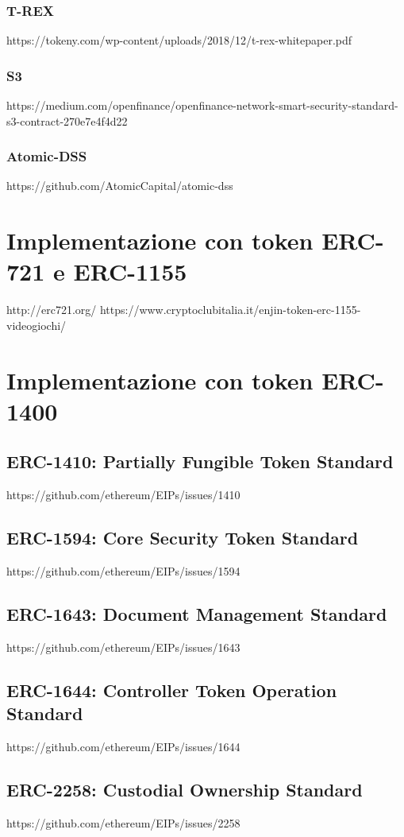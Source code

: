 \subsubsection{T-REX}
https://tokeny.com/wp-content/uploads/2018/12/t-rex-whitepaper.pdf
\subsubsection{S3}
https://medium.com/openfinance/openfinance-network-smart-security-standard-s3-contract-270e7e4f4d22
\subsubsection{Atomic-DSS}
https://github.com/AtomicCapital/atomic-dss

\section{Implementazione con token ERC-721 e ERC-1155}
http://erc721.org/
https://www.cryptoclubitalia.it/enjin-token-erc-1155-videogiochi/
\section{Implementazione con token ERC-1400}
\subsection{ERC-1410: Partially Fungible Token Standard}
https://github.com/ethereum/EIPs/issues/1410
\subsection{ERC-1594: Core Security Token Standard}
https://github.com/ethereum/EIPs/issues/1594
\subsection{ERC-1643: Document Management Standard}
https://github.com/ethereum/EIPs/issues/1643
\subsection{ERC-1644: Controller Token Operation Standard}
https://github.com/ethereum/EIPs/issues/1644
\subsection{ERC-2258: Custodial Ownership Standard}
https://github.com/ethereum/EIPs/issues/2258
